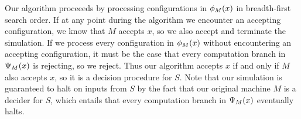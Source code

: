 {\vspace{\baselineskip}


Our algorithm proceeeds by processing configurations in
$\phi_M(x)$ in breadth-first search order. If at any point during
the algorithm we encounter an accepting configuration, we know that
$M$ accepts $x$, so we also accept and terminate the simulation.  If
we process every configuration in $\phi_M(x)$ without encountering
an accepting configuration, it must be the case that every computation
branch in $\Psi_M(x)$ is rejecting, so we reject.  Thus our
algorithm accepts $x$ if and only if $M$ also accepts $x$, so it is a
decision procedure for $S$. Note that our simulation is guaranteed to
halt on inputs from $S$ by the fact that our original machine $M$ is a
decider for $S$, which entails that every computation branch in
$\Psi_M(x)$ eventually halts.

}

